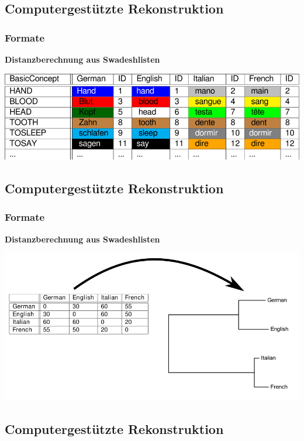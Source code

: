 \subsection{\texorpdfstring{{Computergestützte
Rekonstruktion}}{Computergestützte Rekonstruktion}}

\subsubsection{\texorpdfstring{{Formate}}{Formate}}

\textbf{Distanzberechnung aus Swadeshlisten}

\href{img/cognates-1.svg}{\includegraphics{img/cognates-1.svg}}

\subsection{\texorpdfstring{{Computergestützte
Rekonstruktion}}{Computergestützte Rekonstruktion}}

\subsubsection{\texorpdfstring{{Formate}}{Formate}}

\textbf{Distanzberechnung aus Swadeshlisten}

\href{img/distance-tree.png}{\includegraphics{img/distance-tree.png}}

\subsection{\texorpdfstring{{Computergestützte
Rekonstruktion}}{Computergestützte Rekonstruktion}}

